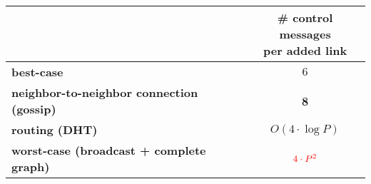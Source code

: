 \small

\begin{tabularx}{0.90\columnwidth}{@{}Xc@{}}
  & \makecell{\# control messages\\per added link} \\
  \hline  
  \textbf{best-case} & $6$ \\ 
  \textbf{neighbor-to-neighbor connection (gossip)} & \textbf{8} \\ 
  \textbf{routing (DHT)} & $O(4 \cdot \log P)$  \\
  \textbf{worst-case (broadcast + complete graph)} & $\textcolor{red}{4 \cdot P^2}$ 
\end{tabularx}

